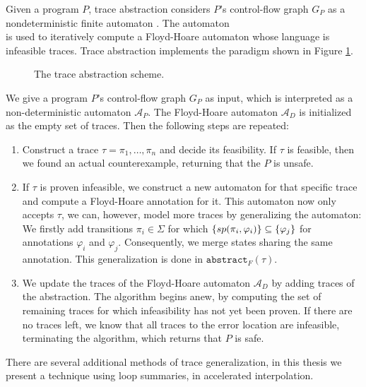 Given a program $P$, trace abstraction considers $P$'s control-flow graph $G_P$ as a nondeterministic finite automaton . The automaton \\  is used to iteratively compute a Floyd-Hoare automaton  whose language is infeasible traces. Trace abstraction implements the paradigm shown in Figure \ref{traceAbstractionScheme}.

\begin{figure}[H]
	\centering
	
	\caption{The trace abstraction scheme.}
	\label{traceAbstractionScheme}
\end{figure}

We give a program $P$'s control-flow graph $G_P$  as input, which is interpreted as a non-deterministic automaton $\mathcal{A}_P$. The Floyd-Hoare automaton $\mathcal{A}_D$ is initialized as the empty set of traces. Then the following steps are repeated: 
\begin{enumerate}
	\item Construct a trace $\tau = \pi_1, \ldots, \pi_n$ and decide its feasibility. If $\tau$ is feasible, then we found an actual counterexample, returning that the $P$ is unsafe.
	\item If $\tau$ is proven infeasible, we construct a new automaton for that specific trace and compute a Floyd-Hoare annotation for it. This automaton now only accepts $\tau$, we can, however, model more traces by generalizing the automaton: We firstly add transitions $\pi_i \in \Sigma$ for which $\{sp(\pi_i, \varphi_i)\} \subseteq \{\varphi_j\}$ for annotations $\varphi_i$ and $\varphi_j$. Consequently, we merge states sharing the same annotation. This generalization is done in $\texttt{abstract}_F(\tau)$.
	\item We update the traces of the Floyd-Hoare automaton $\mathcal{A}_D$ by adding traces of the abstraction. The algorithm begins anew, by computing the set of remaining traces for which infeasibility has not yet been proven. If there are no traces left, we know that all traces to the error location are infeasible, terminating the algorithm, which returns that $P$ is safe.
\end{enumerate}
There are several additional methods of trace generalization, in this thesis we present a technique using loop summaries, in accelerated interpolation. \\ \par

